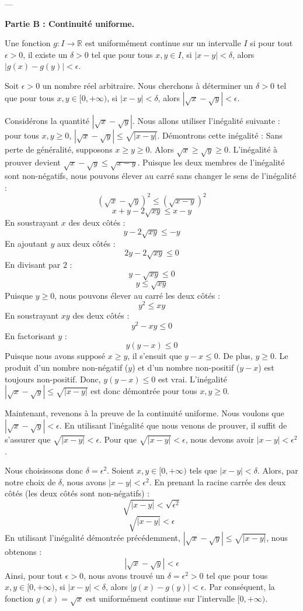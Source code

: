 \documentclass[12pt,a4paper]{report}
\begin{document}
---

\textbf{Partie B : Continuité uniforme.}

Une fonction $g: I \to \mathbb{R}$ est uniformément continue sur un intervalle $I$ si pour tout $\epsilon > 0$, il existe un $\delta > 0$ tel que pour tous $x, y \in I$, si $|x-y| < \delta$, alors $|g(x) - g(y)| < \epsilon$.

Soit $\epsilon > 0$ un nombre réel arbitraire. Nous cherchons à déterminer un $\delta > 0$ tel que pour tous $x, y \in [0, +\infty)$, si $|x-y| < \delta$, alors $|\sqrt{x} - \sqrt{y}| < \epsilon$.

Considérons la quantité $|\sqrt{x} - \sqrt{y}|$.
Nous allons utiliser l'inégalité suivante : pour tous $x, y \ge 0$, $|\sqrt{x} - \sqrt{y}| \le \sqrt{|x-y|}$.
Démontrons cette inégalité :
Sans perte de généralité, supposons $x \ge y \ge 0$. Alors $\sqrt{x} \ge \sqrt{y} \ge 0$.
L'inégalité à prouver devient $\sqrt{x} - \sqrt{y} \le \sqrt{x-y}$.
Puisque les deux membres de l'inégalité sont non-négatifs, nous pouvons élever au carré sans changer le sens de l'inégalité :
$$ (\sqrt{x} - \sqrt{y})^2 \le (\sqrt{x-y})^2 $$
$$ x + y - 2\sqrt{xy} \le x-y $$
En soustrayant $x$ des deux côtés :
$$ y - 2\sqrt{xy} \le -y $$
En ajoutant $y$ aux deux côtés :
$$ 2y - 2\sqrt{xy} \le 0 $$
En divisant par $2$ :
$$ y - \sqrt{xy} \le 0 $$
$$ y \le \sqrt{xy} $$
Puisque $y \ge 0$, nous pouvons élever au carré les deux côtés :
$$ y^2 \le xy $$
En soustrayant $xy$ des deux côtés :
$$ y^2 - xy \le 0 $$
En factorisant $y$ :
$$ y(y-x) \le 0 $$
Puisque nous avons supposé $x \ge y$, il s'ensuit que $y-x \le 0$.
De plus, $y \ge 0$.
Le produit d'un nombre non-négatif ($y$) et d'un nombre non-positif ($y-x$) est toujours non-positif.
Donc, $y(y-x) \le 0$ est vrai.
L'inégalité $|\sqrt{x} - \sqrt{y}| \le \sqrt{|x-y|}$ est donc démontrée pour tous $x, y \ge 0$.

Maintenant, revenons à la preuve de la continuité uniforme.
Nous voulons que $|\sqrt{x} - \sqrt{y}| < \epsilon$.
En utilisant l'inégalité que nous venons de prouver, il suffit de s'assurer que $\sqrt{|x-y|} < \epsilon$.
Pour que $\sqrt{|x-y|} < \epsilon$, nous devons avoir $|x-y| < \epsilon^2$.

Nous choisissons donc $\delta = \epsilon^2$.
Soient $x, y \in [0, +\infty)$ tels que $|x-y| < \delta$.
Alors, par notre choix de $\delta$, nous avons $|x-y| < \epsilon^2$.
En prenant la racine carrée des deux côtés (les deux côtés sont non-négatifs) :
$$ \sqrt{|x-y|} < \sqrt{\epsilon^2} $$
$$ \sqrt{|x-y|} < \epsilon $$
En utilisant l'inégalité démontrée précédemment, $|\sqrt{x} - \sqrt{y}| \le \sqrt{|x-y|}$, nous obtenons :
$$ |\sqrt{x} - \sqrt{y}| < \epsilon $$
Ainsi, pour tout $\epsilon > 0$, nous avons trouvé un $\delta = \epsilon^2 > 0$ tel que pour tous $x, y \in [0, +\infty)$, si $|x-y| < \delta$, alors $|g(x) - g(y)| < \epsilon$.
Par conséquent, la fonction $g(x) = \sqrt{x}$ est uniformément continue sur l'intervalle $[0, +\infty)$.
\end{document}
